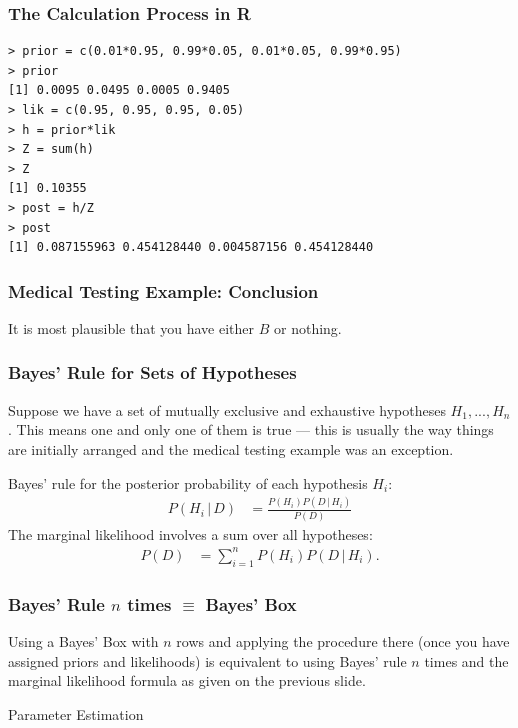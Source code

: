 \documentclass{beamer}
\newcommand{\given}{\,|\,}
\begin{document}
\begin{frame}[fragile]
\frametitle{The Calculation Process in R}

\begin{verbatim}
> prior = c(0.01*0.95, 0.99*0.05, 0.01*0.05, 0.99*0.95)
> prior
[1] 0.0095 0.0495 0.0005 0.9405
> lik = c(0.95, 0.95, 0.95, 0.05)
> h = prior*lik
> Z = sum(h)
> Z
[1] 0.10355
> post = h/Z
> post
[1] 0.087155963 0.454128440 0.004587156 0.454128440
\end{verbatim}

\end{frame}


\begin{frame}
\frametitle{Medical Testing Example: Conclusion}
It is most plausible that you have either $B$ or nothing.

\end{frame}


\begin{frame}
\frametitle{Bayes' Rule for Sets of Hypotheses}
Suppose we have a set of mutually exclusive and exhaustive hypotheses
$H_1, ..., H_n$. This means one and only one of them is true --- this is usually
the way things are initially arranged and the medical testing example was an
exception.\pause

Bayes' rule for the posterior probability of each hypothesis $H_i$:
\begin{align}
P(H_i \given D) &= \frac{P(H_i)P(D \given H_i)}{P(D)}
\end{align}\pause
The marginal likelihood involves a sum over all hypotheses:
\begin{align}
P(D) &= \sum_{i=1}^n P(H_i)P(D \given H_i).
\end{align}

\end{frame}


\begin{frame}
\frametitle{Bayes' Rule $n$ times $\equiv$ Bayes' Box}
Using a Bayes' Box with $n$ rows and applying the procedure there
(once you have assigned priors and likelihoods) is equivalent
to using Bayes' rule $n$ times and the marginal likelihood formula
as given on the previous slide.

\end{frame}

\begin{frame}

\begin{center}
\Large
Parameter Estimation
\end{center}

\end{frame}
\end{document}
